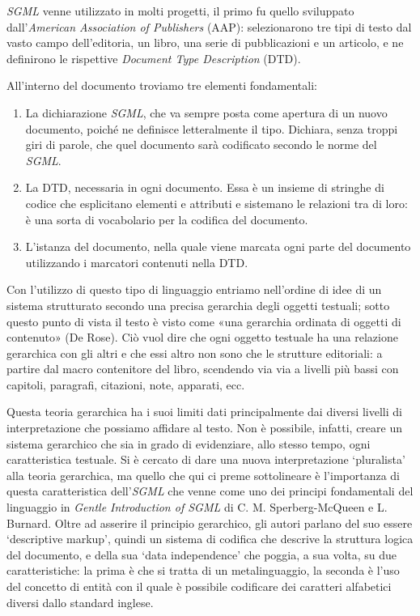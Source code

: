 {\emph{SGML} venne utilizzato in molti progetti, il primo fu quello
sviluppato dall'\emph{American Association of Publishers} (AAP):
selezionarono tre tipi di testo dal vasto campo dell'editoria, un libro,
una serie di pubblicazioni e un articolo, e ne definirono le rispettive
\emph{Document Type Description} (DTD).

All'interno del documento troviamo tre elementi fondamentali:

\begin{enumerate}
\def\labelenumi{\arabic{enumi}.}
\item
  La dichiarazione \emph{SGML}, che va sempre posta come apertura di un
  nuovo documento, poiché ne definisce letteralmente il tipo. Dichiara,
  senza troppi giri di parole, che quel documento sarà codificato
  secondo le norme del \emph{SGML}.
\item
  La DTD, necessaria in ogni documento. Essa è un insieme di stringhe di
  codice che esplicitano elementi e attributi e sistemano le relazioni
  tra di loro: è una sorta di vocabolario per la codifica del documento.
\item
  L'istanza del documento, nella quale viene marcata ogni parte del
  documento utilizzando i marcatori contenuti nella DTD.
\end{enumerate}

Con l'utilizzo di questo tipo di linguaggio entriamo nell'ordine di idee
di un sistema strutturato secondo una precisa gerarchia degli oggetti
testuali; sotto questo punto di vista il testo è visto come «una
gerarchia ordinata di oggetti di contenuto» (De Rose). Ciò vuol dire che
ogni oggetto testuale ha una relazione gerarchica con gli altri e che
essi altro non sono che le strutture editoriali: a partire dal macro
contenitore del libro, scendendo via via a livelli più bassi con
capitoli, paragrafi, citazioni, note, apparati, ecc.

Questa teoria gerarchica ha i suoi limiti dati principalmente dai
diversi livelli di interpretazione che possiamo affidare al testo. Non è
possibile, infatti, creare un sistema gerarchico che sia in grado di
evidenziare, allo stesso tempo, ogni caratteristica testuale. Si è
cercato di dare una nuova interpretazione `pluralista' alla teoria
gerarchica, ma quello che qui ci preme sottolineare è l'importanza di
questa caratteristica dell'\emph{SGML} che venne come uno dei principi
fondamentali del linguaggio in \emph{Gentle Introduction of SGML} di C.
M. Sperberg-McQueen e L. Burnard. Oltre ad asserire il principio
gerarchico, gli autori parlano del suo essere `descriptive markup',
quindi un sistema di codifica che descrive la struttura logica del
documento, e della sua `data independence' che poggia, a sua volta, su
due caratteristiche: la prima è che si tratta di un metalinguaggio, la
seconda è l'uso del concetto di entità con il quale è possibile
codificare dei caratteri alfabetici diversi dallo standard inglese.

}
